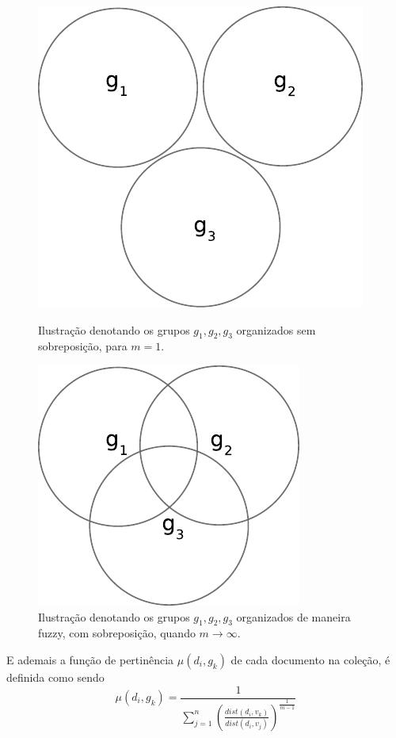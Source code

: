 \begin{figure}[!htp]
  \centering
  \begin{minipage}{0.45\textwidth}
    \centering
    \includegraphics[width=0.6\columnwidth]{assets/clusters_crisp.pdf}
    \caption{Ilustração denotando os grupos $g_1,g_2,g_3$ organizados 
      sem sobreposição, para $m = 1$.}
    \label{fig:cluster_crisp}
  \end{minipage}\hfill
  \begin{minipage}{0.45\textwidth}
    \centering
    \includegraphics[width=0.6\columnwidth]{assets/clusters_fuzzy.pdf}
    \caption{Ilustração denotando os grupos $g_1,g_2,g_3$ organizados de maneira fuzzy, 
      com sobreposição, quando $m \rightarrow \infty$.}
    \label{fig:cluster_fuzzy}
  \end{minipage}
\end{figure}
E ademais a função de pertinência $\mu(d_i,g_k)$ de cada documento na coleção, é definida como sendo 
\begin{equation}
  \mu(d_i,g_k) = \frac{1}{\sum_{j=1}^n(\frac{dist(d_i,v_k)}{dist(d_i,v_j)})^{\frac{1}{m-1}}}
  \label{eq:pertinencia}
\end{equation}
